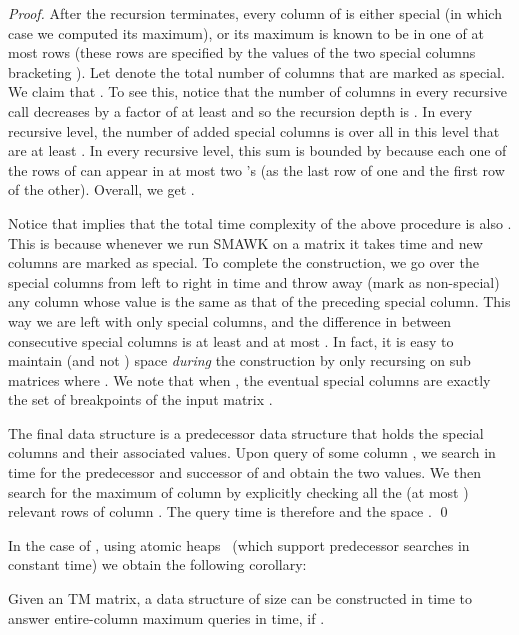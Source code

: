 \documentclass{llncs}
\begin{document}
\begin{proof}
After the recursion terminates, every column  of  is either
special (in which case we computed its maximum), or its maximum  is
known to be in one of at most  rows (these rows are specified by the 
values of the two special columns bracketing ). 
Let  denote the total number of columns that are marked as special. 
We claim that . To see this, notice that the
number of columns in every recursive call decreases by a factor of at
least  and so the recursion depth is . In every recursive level, the number of added special columns is
 over all  in this level that are at least . In
every recursive level, this sum is bounded by  because each one of
the  rows of  can appear in at most two 's  (as the last
row of one and the first row of the other). Overall, we get . 

Notice that  implies that the total time
complexity of the above procedure is also . This
is because whenever we run SMAWK on a  matrix it takes
 time and  new columns are marked as special.  To complete
the construction, we go over the  special columns from left to right in
 time and throw away (mark as non-special) any column whose
 value is the same as that of the preceding special column. This
way we are left with only  special columns, and the difference in
 between consecutive special columns is at least  and at most
. In fact, it is easy to maintain  (and not ) space
{\em during} the construction by only recursing on sub matrices 
where . We note that when , the eventual special columns are
exactly the set of breakpoints of the input matrix .

The final data structure is a predecessor data structure that holds
the  special columns and their associated 
values. Upon query of some column , we search in  time
for the predecessor and successor of  and obtain the two 
values. We then  search for the maximum of column  by explicitly
checking all the (at most ) relevant rows of column . The query time is
therefore   and the space .  
\qed \end{proof}

 

In the case of , using atomic heaps~\cite{FredmanW94} (which support
predecessor searches in constant time) we obtain the following corollary:



\begin{corollary}\label{lem:micro}
Given an  TM matrix, a data structure of size  can be constructed in
 time to answer entire-column maximum queries  in  time, if .
\end{corollary}
\end{document}
